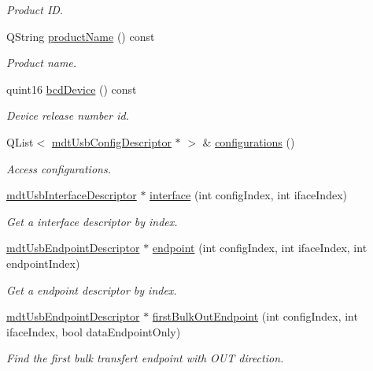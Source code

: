 \begin{DoxyCompactItemize}
\begin{DoxyCompactList}\small\item\em Product ID. \end{DoxyCompactList}\item 
QString \hyperlink{classmdt_usb_device_descriptor_a626afc71d8e72600f12259ac6f5a5866}{productName} () const 
\begin{DoxyCompactList}\small\item\em Product name. \end{DoxyCompactList}\item 
quint16 \hyperlink{classmdt_usb_device_descriptor_a6b6f21f8dfdb707bfc23d01076b7ec5e}{bcdDevice} () const 
\begin{DoxyCompactList}\small\item\em Device release number id. \end{DoxyCompactList}\item 
QList$<$ \hyperlink{classmdt_usb_config_descriptor}{mdtUsbConfigDescriptor} $\ast$ $>$ \& \hyperlink{classmdt_usb_device_descriptor_acfc9e29a48b251012cbc38d339dc6a02}{configurations} ()
\begin{DoxyCompactList}\small\item\em Access configurations. \end{DoxyCompactList}\item 
\hyperlink{classmdt_usb_interface_descriptor}{mdtUsbInterfaceDescriptor} $\ast$ \hyperlink{classmdt_usb_device_descriptor_af1e27ae69d3c77c9dfc53a3f261caeae}{interface} (int configIndex, int ifaceIndex)
\begin{DoxyCompactList}\small\item\em Get a interface descriptor by index. \end{DoxyCompactList}\item 
\hyperlink{classmdt_usb_endpoint_descriptor}{mdtUsbEndpointDescriptor} $\ast$ \hyperlink{classmdt_usb_device_descriptor_a41582e524cba87f52ca3628c0b690b8d}{endpoint} (int configIndex, int ifaceIndex, int endpointIndex)
\begin{DoxyCompactList}\small\item\em Get a endpoint descriptor by index. \end{DoxyCompactList}\item 
\hyperlink{classmdt_usb_endpoint_descriptor}{mdtUsbEndpointDescriptor} $\ast$ \hyperlink{classmdt_usb_device_descriptor_ac1991e3d800700b2c099cd1aca2274d1}{firstBulkOutEndpoint} (int configIndex, int ifaceIndex, bool dataEndpointOnly)
\begin{DoxyCompactList}\small\item\em Find the first bulk transfert endpoint with OUT direction. \end{DoxyCompactList}\item 

\end{DoxyCompactItemize}
